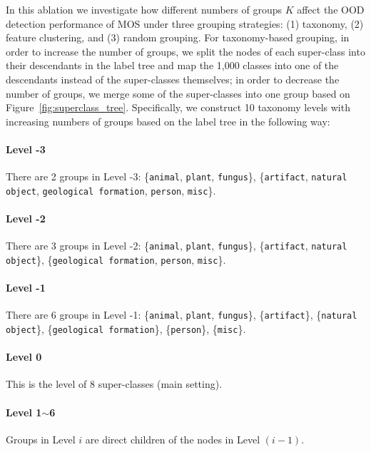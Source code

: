 \documentclass[final]{cvpr}
\begin{document}
In this ablation we investigate how different numbers of groups $K$  affect the OOD detection performance of MOS under three grouping strategies: (1) taxonomy, (2) feature clustering, and (3) random grouping. For taxonomy-based grouping, in order to increase the number of groups, we split the nodes of each super-class into their descendants in the label tree and map the 1,000 classes into one of the descendants instead of the super-classes themselves; in order to decrease the number of groups, we merge some of the super-classes into one group based on Figure~\ref{fig:superclass_tree}. Specifically, we construct 10 taxonomy levels with increasing numbers of groups based on the label tree in the following way:

\vspace{-0.4cm}
\paragraph{Level -3} There are 2 groups in Level -3: \{\texttt{animal}, \texttt{plant}, \texttt{fungus}\}, \{\texttt{artifact}, \texttt{natural object}, \texttt{geological formation}, \texttt{person}, \texttt{misc}\}.

\vspace{-0.4cm}
\paragraph{Level -2} There are 3 groups in Level -2: \{\texttt{animal}, \texttt{plant}, \texttt{fungus}\}, \{\texttt{artifact}, \texttt{natural object}\}, \{\texttt{geological formation}, \texttt{person}, \texttt{misc}\}.

\vspace{-0.4cm}
\paragraph{Level -1} There are 6 groups in Level -1: \{\texttt{animal}, \texttt{plant}, \texttt{fungus}\}, \{\texttt{artifact}\}, \{\texttt{natural object}\}, \{\texttt{geological formation}\}, \{\texttt{person}\}, \{\texttt{misc}\}.

\vspace{-0.4cm}
\paragraph{Level 0} This is the level of 8 super-classes (main setting).

\vspace{-0.4cm}
\paragraph{Level 1$\sim$6} Groups in Level $i$ are direct children of the nodes in Level $(i-1)$.
\end{document}
